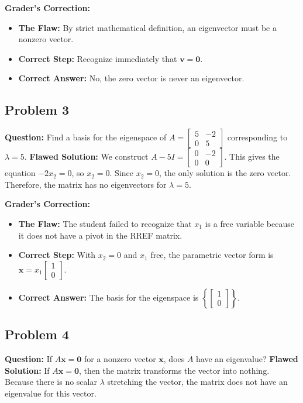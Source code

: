 \documentclass[11pt, a4paper]{article}
\theoremstyle{definition}
\theoremstyle{remark}
\begin{document}
\textbf{Grader's Correction:}
\begin{itemize}
    \item \textbf{The Flaw:} By strict mathematical definition, an eigenvector must be a nonzero vector.
    \item \textbf{Correct Step:} Recognize immediately that $\mathbf{v} = \mathbf{0}$.
    \item \textbf{Correct Answer:} No, the zero vector is never an eigenvector.
\end{itemize}

\subsection{Problem 3}
\textbf{Question:} Find a basis for the eigenspace of $A = \begin{bmatrix} 5 & -2 \\ 0 & 5 \end{bmatrix}$ corresponding to $\lambda = 5$.
\textbf{Flawed Solution:}
We construct $A - 5I = \begin{bmatrix} 0 & -2 \\ 0 & 0 \end{bmatrix}$.
This gives the equation $-2x_2 = 0$, so $x_2 = 0$. Since $x_2 = 0$, the only solution is the zero vector. Therefore, the matrix has no eigenvectors for $\lambda = 5$.

\textbf{Grader's Correction:}
\begin{itemize}
    \item \textbf{The Flaw:} The student failed to recognize that $x_1$ is a free variable because it does not have a pivot in the RREF matrix.
    \item \textbf{Correct Step:} With $x_2 = 0$ and $x_1$ free, the parametric vector form is $\mathbf{x} = x_1 \begin{bmatrix} 1 \\ 0 \end{bmatrix}$.
    \item \textbf{Correct Answer:} The basis for the eigenspace is $\left\{ \begin{bmatrix} 1 \\ 0 \end{bmatrix} \right\}$.
\end{itemize}

\subsection{Problem 4}
\textbf{Question:} If $A\mathbf{x} = \mathbf{0}$ for a nonzero vector $\mathbf{x}$, does $A$ have an eigenvalue?
\textbf{Flawed Solution:}
If $A\mathbf{x} = \mathbf{0}$, then the matrix transforms the vector into nothing. Because there is no scalar $\lambda$ stretching the vector, the matrix does not have an eigenvalue for this vector.
\end{document}

